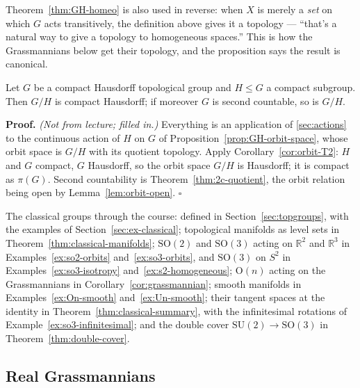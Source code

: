 \documentclass[11pt]{report}
\makeatletter
\newcounter{thmcounter}[section]
\renewenvironment{proof}[1][Proof]{\noindent\textbf{#1.} }{\hfill$\square$\par\vspace{5pt}}
\newcommand{\thmlabel}[1]{\edef\@currentlabel{\arabic{section}.\arabic{thmcounter}}\label{#1}}
\newcommand{\Ogp}{\mathrm{O}}
\newcommand{\SO}{\mathrm{SO}}
\newcommand{\leeref}[1]{\par\smallskip{\raggedleft\footnotesize\textsc{Lee}:\ #1\par}}
\makeatother
\begin{document}
\begin{rembox}\label{rem:giving-set-topology}
Theorem~\ref{thm:GH-homeo} is also used in reverse: when $X$ is merely a \emph{set} on which $G$ acts transitively, the definition above gives it a topology --- ``that's a natural way to give a topology to homogeneous spaces.'' This is how the Grassmannians below get their topology, and the proposition says the result is canonical.
\end{rembox}

\begin{corbox}\thmlabel{cor:GH-nice}
Let $G$ be a compact Hausdorff topological group and $H \le G$ a compact subgroup. Then $G/H$ is compact Hausdorff; if moreover $G$ is second countable, so is $G/H$.
\leeref{Theorem 21.17}
\end{corbox}

\begin{proof}
\textit{(Not from lecture; filled in.)} Everything is an application of \ref{sec:actions} to the continuous action of $H$ on $G$ of Proposition~\ref{prop:GH-orbit-space}, whose orbit space is $G/H$ with its quotient topology. Apply Corollary~\ref{cor:orbit-T2}: $H$ and $G$ compact, $G$ Hausdorff, so the orbit space $G/H$ is Hausdorff; it is compact as $\pi(G)$. Second countability is Theorem~\ref{thm:2c-quotient}, the orbit relation being open by Lemma~\ref{lem:orbit-open}.
\end{proof}

The classical groups through the course: defined in Section~\ref{sec:topgroups}, with the examples of Section~\ref{sec:ex-classical}; topological manifolds as level sets in Theorem~\ref{thm:classical-manifolds}; $\SO(2)$ and $\SO(3)$ acting on $\mathbb{R}^2$ and $\mathbb{R}^3$ in Examples~\ref{ex:so2-orbits} and~\ref{ex:so3-orbits}, and $\SO(3)$ on $S^2$ in Examples~\ref{ex:so3-isotropy} and~\ref{ex:s2-homogeneous}; $\Ogp(n)$ acting on the Grassmannians in Corollary~\ref{cor:grassmannian}; smooth manifolds in Examples~\ref{ex:On-smooth} and~\ref{ex:Un-smooth}; their tangent spaces at the identity in Theorem~\ref{thm:classical-summary}, with the infinitesimal rotations of Example~\ref{ex:so3-infinitesimal}; and the double cover $\mathrm{SU}(2) \to \SO(3)$ in Theorem~\ref{thm:double-cover}.


\subsection{Real Grassmannians}
\end{document}
